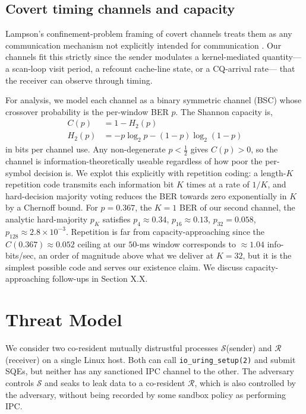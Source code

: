 \documentclass[letterpaper,twocolumn,10pt]{article}
\newcommand{\code}[1]{\texttt{#1}}
\newcommand{\s}{\ensuremath{\mathcal{S}}\xspace}
\renewcommand{\r}{\ensuremath{\mathcal{R}}\xspace}
\begin{document}
\subsection{Covert timing channels and capacity}
Lampson's confinement-problem framing of covert channels treats them as any communication mechanism not explicitly intended for communication \cite{lampson1973note}. Our channels fit this strictly since the sender modulates a kernel-mediated quantity--- a scan-loop visit period, a refcount cache-line state, or a CQ-arrival rate--- that the receiver can observe through timing.

For analysis, we model each channel as a binary symmetric channel (BSC) whose crossover probability is the per-window BER $p$. The Shannon capacity is,
\begin{align*}
    C(p) &= 1 - H_2(p) \\
    H_2(p) &= -p \log_2 p - (1- p) \log_2 (1-p)
\end{align*}
in bits per channel use. Any non-degenerate $p < \frac{1}{2}$ gives $C(p) > 0$, so the channel is information-theoretically useable regardless of how poor the per-symbol decision is. We explot this explicitly with repetition coding: a length-$K$ repetition code transmits each information bit $K$ times at a rate of $1/K$, and hard-decision majority voting reduces the BER towards zero exponentially in $K$ by a Chernoff bound. For $p=0.367$, the $K=1$ BER of our second channel, the analytic hard-majority $p_K$ satisfies $p_4 \approx 0.34$, $p_{16} \approx 0.13$, $p_{32} = 0.058$, $p_{128} \approx 2.8 \times 10^{-3}$. Repetition is far from capacity-approaching since the $C(0.367) \approx 0.052$ ceiling at our $50$-ms window corresponds to $\approx 1.04$ info-bits/sec, an order of magnitude above what we deliver at $K=32$, but it is the simplest possible code and serves our existence claim. We discuss capacity-approaching follow-ups in Section X.X. %

\section{Threat Model}
We consider two co-resident mutually distrustful processes \s (sender) and \r (receiver) on a single Linux host. Both can call \code{io\_uring\_setup(2)} and submit SQEs, but neither has any sanctioned IPC channel to the other. The adversary controls \s and seaks to leak data to a co-resident \r, which is also controlled by the adversary, without being recorded by some sandbox policy as performing IPC.
\end{document}
